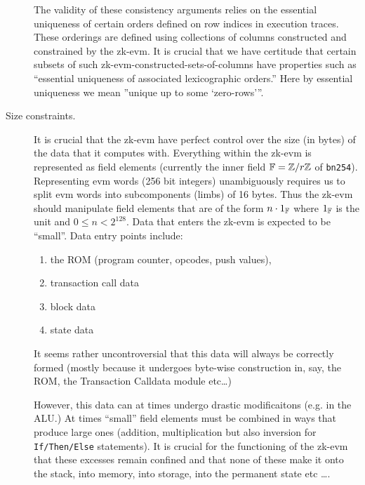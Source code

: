 \documentclass{article}
\begin{document}
\begin{description}
	The validity of these consistency arguments relies on the essential uniqueness of certain orders defined on row indices in execution traces. These orderings are defined using collections of columns constructed and constrained by the zk-evm. It is crucial that we have certitude that certain subsets of such zk-evm-constructed-sets-of-columns have properties such as ``essential uniqueness of associated lexicographic orders.'' Here by essential uniqueness we mean ''unique up to some `zero-rows'''.
	\item[Size constraints.] It is crucial that the zk-evm have perfect control over the size (in bytes) of the data that it computes with. Everything within the zk-evm is represented as field elements (currently the inner field $\Bbb{F} = \Bbb{Z} / r\Bbb{Z}$ of \texttt{bn254}). Representing evm words (256 bit integers) unambiguously requires us to split evm words into subcomponents (limbs) of 16 bytes. Thus the zk-evm should manipulate field elements that are of the form $n\cdot 1_\Bbb{F}$ where $1_\Bbb{F}$ is the unit and $0\leq n < 2^{128}$. Data that enters the zk-evm is expected to be ``small''. Data entry points include:
	\begin{enumerate}
		\item the ROM (program counter, opcodes, push values),
		\item transaction call data
		\item block data
		\item state data
	\end{enumerate}
	It seems rather uncontroversial that this data will always be correctly formed (mostly because it undergoes byte-wise construction in, say, the ROM, the Transaction Calldata module etc\dots{})

	However, this data can at times undergo drastic modificaitons (e.g. in the ALU.) At times ``small'' field elements must be combined in ways that produce large ones (addition, multiplication but also inversion for \texttt{If/Then/Else} statements). It is crucial for the functioning of the zk-evm that these excesses remain confined and that none of these make it onto the stack, into memory, into storage, into the permanent state etc \dots{}.


\end{description}
\end{document}
